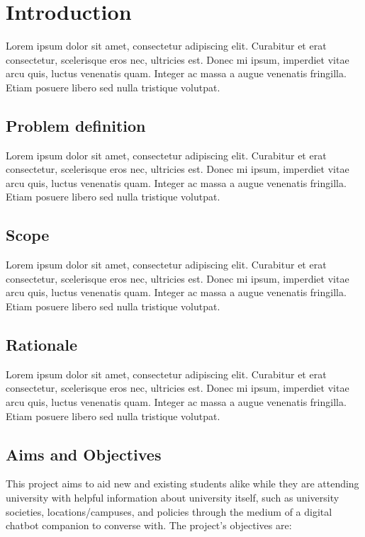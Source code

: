 \chapter{Introduction}
Lorem ipsum dolor sit amet, consectetur adipiscing elit. Curabitur et erat consectetur, 
scelerisque eros nec, ultricies est. Donec mi ipsum, imperdiet vitae arcu quis, luctus venenatis quam. 
Integer ac massa a augue venenatis fringilla. Etiam posuere libero sed nulla tristique volutpat.

\section{Problem definition}
Lorem ipsum dolor sit amet, consectetur adipiscing elit. Curabitur et erat consectetur, 
scelerisque eros nec, ultricies est. Donec mi ipsum, imperdiet vitae arcu quis, luctus venenatis quam. 
Integer ac massa a augue venenatis fringilla. Etiam posuere libero sed nulla tristique volutpat.

\section{Scope}
Lorem ipsum dolor sit amet, consectetur adipiscing elit. Curabitur et erat consectetur, 
scelerisque eros nec, ultricies est. Donec mi ipsum, imperdiet vitae arcu quis, luctus venenatis quam. 
Integer ac massa a augue venenatis fringilla. Etiam posuere libero sed nulla tristique volutpat.

\section{Rationale}
Lorem ipsum dolor sit amet, consectetur adipiscing elit. Curabitur et erat consectetur, 
scelerisque eros nec, ultricies est. Donec mi ipsum, imperdiet vitae arcu quis, luctus venenatis quam. 
Integer ac massa a augue venenatis fringilla. Etiam posuere libero sed nulla tristique volutpat.

\section{Aims and Objectives}
This project aims to aid new and existing students alike while they are attending university with 
helpful information about university itself, such as university societies, locations/campuses, 
and policies through the medium of a digital chatbot companion to converse with.
The project's objectives are:

